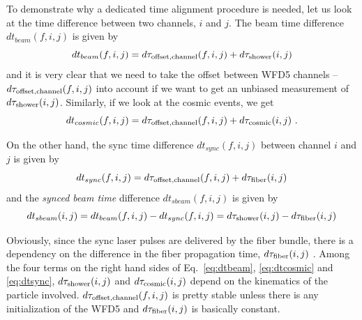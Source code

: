 To demonstrate why a dedicated time alignment procedure is needed, let us look at the time difference between two channels, $i$ and $j$. The beam time difference $dt_{beam}(f,i,j)$ is given by
%
\begin{equation}
dt_{beam}(f,i,j) = d\tau_{\rm{offset,channel}}(f,i,j)  + d\tau_{\rm{shower}}(i,j) \label{eq:dtbeam}
\end{equation}
%
and it is very clear that we need to take the offset between WFD5 channels -- $d\tau_{\rm{offset,channel}}(f,i,j)$ into account if we want to get an unbiased measurement of $d\tau_{\rm{shower}}(i,j)$. Similarly, if we look at the cosmic events, we get
%
\begin{equation}
dt_{cosmic}(f,i,j) = d\tau_{\rm{offset,channel}}(f,i,j)  + d\tau_{\rm{cosmic}}(i,j)~. \label{eq:dtcosmic}
\end{equation}
%

On the other hand, the sync time difference $dt_{sync}(f,i,j)$ between channel $i$ and $j$ is given by
%
\begin{equation}
dt_{sync}(f,i,j) = d\tau_{\rm{offset,channel}}(f,i,j) + d\tau_{\rm{fiber}}(i,j)
\label{eq:dtsync}
\end{equation}
%
and the \textit{synced beam time} difference $dt_{sbeam}(f,i,j)$ is given by
%
\begin{equation}
dt_{sbeam}(i,j) = dt_{beam}(f,i,j) - dt_{sync}(f,i,j) = d\tau_{\rm{shower}}(i,j) - d\tau_{\rm{fiber}}(i,j)
\label{eq:dtsbeam}
\end{equation}

Obviously, since the sync laser pulses are delivered by the fiber bundle, there is a dependency on the difference in the fiber propagation time, $ d\tau_{\rm{fiber}}(i,j)$ .
Among the four terms on the right hand sides of Eq.~\ref{eq:dtbeam}, \ref{eq:dtcosmic} and \ref{eq:dtsync}, $d\tau_{\rm{shower}}(i,j)$ and $d\tau_{\rm{cosmic}}(i,j)$ depend on the kinematics of the particle involved. $d\tau_{\rm{offset,channel}}(f,i,j)$ is pretty stable unless there is any initialization of the WFD5 and $d\tau_{\rm{fiber}}(i,j)$ is basically constant.

